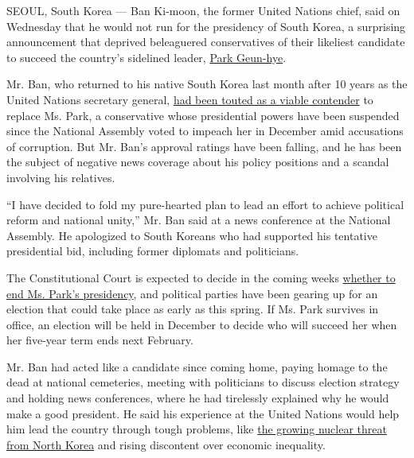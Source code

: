SEOUL, South Korea --- Ban Ki-moon, the former United Nations chief,
said on Wednesday that he would not run for the presidency of South
Korea, a surprising announcement that deprived beleaguered conservatives
of their likeliest candidate to succeed the country's sidelined leader,
\href{https://www.nytimes3xbfgragh.onion/topic/person/park-geunhye?inline=nyt-per}{Park
Geun-hye}.

Mr. Ban, who returned to his native South Korea last month after 10
years as the United Nations secretary general,
\href{https://www.nytimes3xbfgragh.onion/2017/01/25/world/asia/ban-ki-moon-south-korea-president.html}{had
been touted as a viable contender} to replace Ms. Park, a conservative
whose presidential powers have been suspended since the National
Assembly voted to impeach her in December amid accusations of
corruption. But Mr. Ban's approval ratings have been falling, and he has
been the subject of negative news coverage about his policy positions
and a scandal involving his relatives.

``I have decided to fold my pure-hearted plan to lead an effort to
achieve political reform and national unity,'' Mr. Ban said at a news
conference at the National Assembly. He apologized to South Koreans who
had supported his tentative presidential bid, including former diplomats
and politicians.

The Constitutional Court is expected to decide in the coming weeks
\href{https://www.nytimes3xbfgragh.onion/2016/12/22/world/asia/south-korea-president-park-impeachment.html}{whether
to end Ms. Park's presidency}, and political parties have been gearing
up for an election that could take place as early as this spring. If Ms.
Park survives in office, an election will be held in December to decide
who will succeed her when her five-year term ends next February.

Mr. Ban had acted like a candidate since coming home, paying homage to
the dead at national cemeteries, meeting with politicians to discuss
election strategy and holding news conferences, where he had tirelessly
explained why he would make a good president. He said his experience at
the United Nations would help him lead the country through tough
problems, like
\href{https://www.nytimes3xbfgragh.onion/2017/01/09/world/asia/north-korea-trump-icbm-test.html?rref=collection\%2Ftimestopic\%2FNuclear\%20Weapons\&action=click\&contentCollection=science\&region=stream\&module=stream_unit\&version=search\&contentPlacement=4\&pgtype=collection}{the
growing nuclear threat from North Korea} and rising discontent over
economic inequality.

